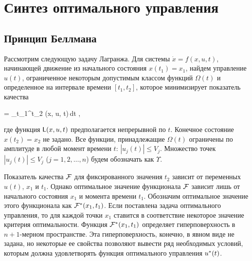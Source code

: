 \chapter{Синтез оптимального управления}
\newcommand{\optF}{  \optimum{\calf{F}} } %
\newcommand{\optU}{  \optimum{u}        } %
\newcommand{\optX}{  \optimum{x}        } %
\newcommand{\funcL}{ \sff{L}            } %




\section{Принцип Беллмана}



Рассмотрим следующую задачу Лагранжа. Для системы $\dot{x} = f(x, u, t)$, начинающей движение из начального состояния $x(t_1) = x_1$, найдем управление $u(t)$, ограниченное некоторым допустимым классом функций $\Omega(t)$ и определенное на интервале времени $[t_1, t_2]$, которое минимизирует показатель качества

     = \int\limits_{t_1}^{t_2} \funcL(x, u, t)\,dt \mbox{,}
\eeq

где функция $\funcL(x, u, t)$ предполагается непрерывной по $t$. Конечное состояние $x(t_2) = x_2$ не задано. Все функции, принадлежащие $\Omega(t)$ ограничены по амплитуде в любой момент времени $t$: $|u_j(t)| \leqslant V_j$. Множество точек $|u_j(t)| \leqslant V_j$ ($j = 1, 2, \ldots, n$) будем обозначать как $\Upsilon$.

Показатель качества $\mathcal{F}$ для фиксированного значения $t_2$ зависит от переменных $u(t)$, $x_1$ и $t_1$. Однако оптимальное значение функционала $\mathcal{F}$ зависит лишь от начального состояния $x_1$ и момента времени $t_1$. Обозначим оптимальное значение этого функционала как $\optF(x_1, t_1)$. Если поставлена задача оптимального управления, то для каждой точки $x_1$ ставится в соответствие некоторое значение критерия оптимальности. Функция $\optF(x_1, t_1)$ определяет гиперповерхность в $n+1$-мерном пространстве. Эта гиперповерхность, конечно, в явном виде не задана, но некоторые ее свойства позволяют вывести ряд необходимых условий, которым должна удовлетворять функция оптимального управления $\optU(t)$.

